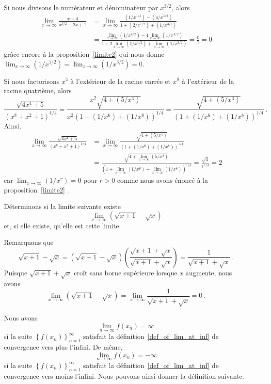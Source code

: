 {\begin{egg}
 Si nous divisons le numérateur et dénominateur par $x^{3/2}$, alors
\begin{align*}
\lim_{x\to \infty} \frac{x-4}{x^{3/2} + 2x +1}
&= \lim_{x\to \infty} \frac{(1/x^{1/2})-(4/x^{3/2})}
{1 + (2/x^{1/2}) +(1/x^{3/2})}\\
&= \frac{\displaystyle \lim_{x\to \infty} (1/x^{1/2})
 - 4 \lim_{x\to \infty} (1/x^{3/2})}
{\displaystyle 1 + 2 \lim_{x\to \infty}(1/x^{1/2})
 + \lim_{x\to \infty} (1/x^{3/2})}
= \frac{0}{1} = 0
\end{align*}
grâce encore à la proposition~\ref{limite2} qui nous donne
$\displaystyle \lim_{x\to \infty}(1/x^{1/2}) = \lim_{x\to \infty}(1/x^{3/2}) = 0$.

 Si nous factorisons $x^4$ à l'extérieur de la racine carrée et
$x^8$ à l'extérieur de la racine quatrième, alors
\[
\frac{\sqrt{4x^4+5}}{\left(x^8 + x^2 + 1\right)^{1/4}}
= \frac{x^2 \sqrt{4 + (5/x^4)}}{x^2\left(1 + (1/x^6) + (1/x^8)\right)^{1/4}}
= \frac{\sqrt{4 + (5/x^4)}}{\left(1 + (1/x^6) + (1/x^8)\right)^{1/4}} \ .
\]
Ainsi,
\begin{align*}
\lim_{x\to \infty} \frac{\sqrt{4x^4+5}}{ \left(x^8 + x^2 + 1\right)^{1/4}}
&= \lim_{x\to \infty}
\frac{\sqrt{4 + (5/x^4)}}{\left(1 + (1/x^6) + (1/x^8)\right)^{1/4}}\\
&= \frac{\sqrt{\displaystyle 4 + \lim_{x\to \infty} (5/x^4)}}
{\left(\displaystyle 1 + \lim_{x\to \infty} (1/x^6)
+ \lim_{x\to \infty} (1/x^8)\right)^{1/4}}
= \frac{\sqrt{4}}{1^{1/4}} = 2
\end{align*}
car $\displaystyle \lim_{x\to \infty}(1/x^r) = 0$ pour $r>0$ comme nous
avons énoncé à la proposition~\ref{limite2} .
\end{egg}

\begin{egg}
Déterminons si la limite suivante existe
\[
\lim_{x\rightarrow \infty} \left(\sqrt{x+1}-\sqrt{x}\right)
\]
et, si elle existe, qu'elle est cette limite.

Remarquons que
\[
\sqrt{x+1}-\sqrt{x} = \left
(\sqrt{x+1}-\sqrt{x}\right)
\left(\frac{\sqrt{x+1}+\sqrt{x}}{\sqrt{x+1}+\sqrt{x}}\right)
= \frac{1}{\sqrt{x+1}+\sqrt{x}} \ .
\]
Puisque $\sqrt{x+1}+\sqrt{x}$ croît sans borne supérieure lorsque $x$
augmente, nous avons
\[
\lim_{x\rightarrow \infty} \left(\sqrt{x+1}-\sqrt{x}\right)
= \lim_{x\rightarrow \infty} \frac{1}{\sqrt{x+1}+\sqrt{x}} = 0 \ .
\]
\label{conjinfty}
\end{egg}

Nous avons
\[
\lim_{n\rightarrow \infty} f(x_n) = \infty
\]
si la suite $\displaystyle \left\{ f(x_n) \right\}_{n=1}^\infty$
satisfait la définition~\ref{def_of_lim_at_inf} de convergence vers
plus l'infini.  De même,
\[
\lim_{n\rightarrow \infty} f(x_n) = -\infty
\]
si la suite $\displaystyle \left\{ f(x_n) \right\}_{n=1}^\infty$
satisfait la définition~\ref{def_of_lim_at_inf} de convergence vers
moins l'infini.  Nous pouvons ainsi donner la définition suivante.

}
